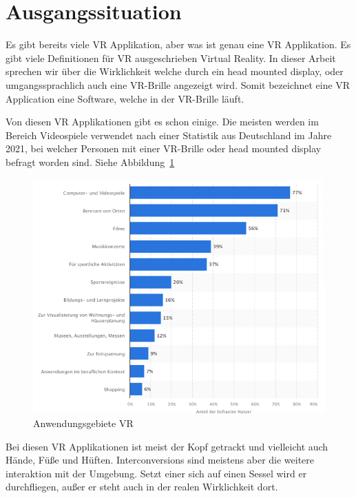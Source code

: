 \section{Ausgangssituation}\label{sec: initial_situation}

Es gibt bereits viele VR Applikation, aber was ist genau eine VR Applikation.
Es gibt viele Definitionen für VR ausgeschrieben Virtual Reality.
In dieser Arbeit sprechen wir über die Wirklichkeit welche durch ein head mounted display, oder umgangssprachlich auch eine VR-Brille angezeigt wird.
Somit bezeichnet eine VR Application eine Software, welche in der VR-Brille läuft.

Von diesen VR Applikationen gibt es schon einige.
Die meisten werden im Bereich Videospiele verwendet nach einer Statistik aus Deutschland im Jahre 2021, bei welcher Personen mit einer VR-Brille oder head mounted display befragt worden sind.
Siehe Abbildung~\ref{fig:statistic_usage_vr}

\begin{figure}
    \includegraphics[scale=0.5]{pics/statistic_usage_vr}
    \caption{Anwendungsgebiete VR}
    \label{fig:statistic_usage_vr}
\end{figure}

Bei diesen VR Applikationen ist meist der Kopf getrackt und vielleicht auch Hände, Füße und Hüften.
Interconversions sind meistens aber die weitere interaktion mit der Umgebung.
Setzt einer sich auf einen Sessel wird er durchfliegen, außer er steht auch in der realen Wirklichkeit dort.

